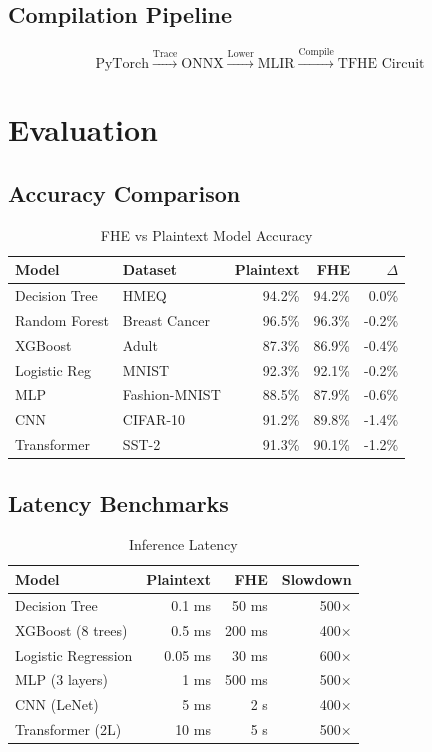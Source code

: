 \documentclass{../shared/luxfhe}
\begin{document}
\subsection{Compilation Pipeline}

\[
\text{PyTorch} \xrightarrow{\text{Trace}} \text{ONNX} \xrightarrow{\text{Lower}} \text{MLIR} \xrightarrow{\text{Compile}} \text{TFHE Circuit}
\]

\section{Evaluation}

\subsection{Accuracy Comparison}

\begin{table}[h]
\centering
\caption{FHE vs Plaintext Model Accuracy}
\begin{tabular}{llrrr}
\toprule
Model & Dataset & Plaintext & FHE & $\Delta$ \\
\midrule
Decision Tree & HMEQ & 94.2\% & 94.2\% & 0.0\% \\
Random Forest & Breast Cancer & 96.5\% & 96.3\% & -0.2\% \\
XGBoost & Adult & 87.3\% & 86.9\% & -0.4\% \\
Logistic Reg & MNIST & 92.3\% & 92.1\% & -0.2\% \\
MLP & Fashion-MNIST & 88.5\% & 87.9\% & -0.6\% \\
CNN & CIFAR-10 & 91.2\% & 89.8\% & -1.4\% \\
Transformer & SST-2 & 91.3\% & 90.1\% & -1.2\% \\
\bottomrule
\end{tabular}
\end{table}

\subsection{Latency Benchmarks}

\begin{table}[h]
\centering
\caption{Inference Latency}
\begin{tabular}{lrrr}
\toprule
Model & Plaintext & FHE & Slowdown \\
\midrule
Decision Tree & 0.1 ms & 50 ms & 500$\times$ \\
XGBoost (8 trees) & 0.5 ms & 200 ms & 400$\times$ \\
Logistic Regression & 0.05 ms & 30 ms & 600$\times$ \\
MLP (3 layers) & 1 ms & 500 ms & 500$\times$ \\
CNN (LeNet) & 5 ms & 2 s & 400$\times$ \\
Transformer (2L) & 10 ms & 5 s & 500$\times$ \\
\bottomrule
\end{tabular}
\end{table}
\end{document}
